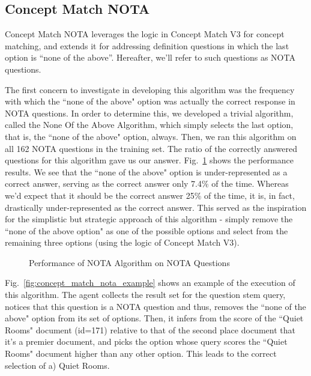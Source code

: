 \subsection{Concept Match NOTA}

Concept Match NOTA leverages the logic in Concept Match V3 for concept matching, and extends it for addressing definition questions in which the last option is ``none of the above''.  Hereafter, we'll refer to such questions as NOTA questions.

The first concern to investigate in developing this algorithm was the frequency with which the ``none of the above" option was actually the correct response in NOTA questions.  In order to determine this, we developed a trivial algorithm, called the None Of the Above Algorithm, which simply selects the last option, that is, the ``none of the above" option, always.  Then, we ran this algorithm on all 162 NOTA questions in the training set.  The ratio of the correctly answered questions for this algorithm gave us our answer.  Fig.~\ref{fig:nota_training_set_performance} shows the performance results.  We see that the ``none of the above" option is under-represented as a correct answer, serving as the correct answer only 7.4\% of the time.  Whereas we'd expect that it should be the correct answer 25\% of the time, it is, in fact, drastically under-represented as the correct answer.  This served as the inspiration for the simplistic but strategic approach of this algorithm - simply remove the ``none of the above option" as one of the possible options and select from the remaining three options (using the logic of Concept Match V3).

\begin{figure}
\centering
\vspace{0.75in}
\caption{Performance of NOTA Algorithm on NOTA Questions}
\label{fig:nota_training_set_performance}
\end{figure}


Fig.~\ref{fig:concept_match_nota_example} shows an example of the execution of this algorithm.  The agent collects the result set for the question stem query, notices that this question is a NOTA question and thus, removes the ``none of the above" option from its set of options.  Then, it infers from the score of the ``Quiet Rooms" document (id=171) relative to that of the second place document that it's a premier document, and picks the option whose query scores the ``Quiet Rooms" document higher than any other option.  This leads to the correct selection of a) Quiet Rooms.


